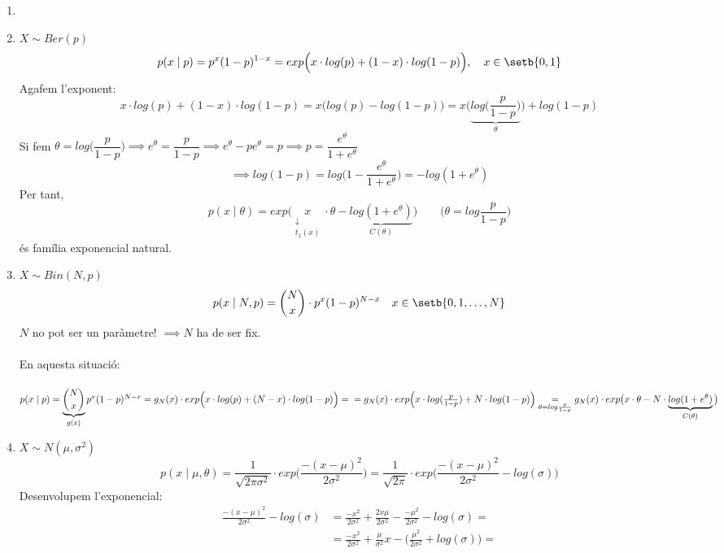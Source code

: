 \begin{example}
  \begin{enumerate}
  \item[]
      \item $X\sim Ber(p)$
      \[
        p(x\mid p) = p^{x}(1-p)^{1-x} = exp\Big(x\cdot log(p) + (1-x)\cdot log(1-p)\Big), \quad x\in\setb{0,1}
      \]
      Agafem l'exponent:
      \[
        x\cdot log(p) + (1-x)\cdot log(1-p) = x\Big(log(p) - log(1-p)\Big) = x\bigg(\underbrace{log\Big(\frac{p}{1-p}\Big)}_{\theta} \bigg) + log(1-p)
      \]
      Si fem $\theta = log\Big(\dfrac{p}{1-p}\Big) \implies e^{\theta} = \dfrac{p}{1-p} \implies e^{\theta} - pe^{\theta} = p \implies p = \dfrac{e^{\theta}}{1+e^{\theta}}$
      \[
        \implies log(1-p) = log\bigg(1-\frac{e^{\theta}}{1+e^{\theta}}\bigg) = -log(1+e^{\theta})
      \]
      Per tant, 
      \[
        p(x\mid \theta) = exp\Big(\underset{\substack{\downarrow \\ t_{1}(x)}}{x}\cdot\theta - \underbrace{log(1+e^{\theta})}_{C(\theta)}\Big) \qquad \bigg(\theta = log\frac{p}{1-p}\bigg)
      \]
      és família exponencial natural.
      \item $X\sim Bin(N,p)$
      \[
        p(x\mid N,p) = \binom{N}{x}\cdot p^{x}(1-p)^{N-x} \quad x \in \setb{0,1,\ldots,N}
      \]
      $N$ no pot ser un paràmetre! $\implies N$ ha de ser fix. \\\\
      En aquesta situació: \\\\
      $
        p(x\mid p) = \underbrace{\binom{N}{x}}_{g(x)} p^{x}(1-p)^{N-x} = g_{N}(x)\cdot exp\Big(x\cdot log(p) + (N-x)\cdot log(1-p)\Big) = \\=g_{N}(x)\cdot exp\Big(x\cdot log(\frac{p}{1-p}) + N\cdot log(1-p)\Big) \underset{\theta = log\frac{p}{1-p}}{=}
        g_{N}(x)\cdot exp\big(x\cdot\theta - N\cdot \underbrace{log(1+e^{\theta})}_{C(\theta)}\big)
      $
      \item $X\sim N(\mu, \sigma^{2})$
      \[
        p(x\mid \mu, \theta) = \frac{1}{\sqrt{2\pi\sigma^{2}}}\cdot exp\bigg(\frac{-(x-\mu)^{2}}{2\sigma^{2}}\bigg) = \frac{1}{\sqrt{2\pi}}\cdot exp\bigg(\frac{-(x-\mu)^{2}}{2\sigma^{2}}-log(\sigma)\bigg)
      \]
      Desenvolupem l'exponencial:
      \[
      \begin{split}
          \frac{-(x-\mu)^{2}}{2\sigma^{2}}-log(\sigma) &= \frac{-x^{2}}{2\sigma^{2}}+\frac{2x\mu}{2\sigma^{2}}-\frac{-\mu^{2}}{2\sigma^{2}}-log(\sigma) = \\
          &= \frac{-x^{2}}{2\sigma^{2}} + \frac{\mu}{\sigma^{2}}x - \Big(\frac{\mu^{2}}{2\sigma^{2}}+log(\sigma)\Big)= \\

\end{split}\]
\end{enumerate}
\end{example}
